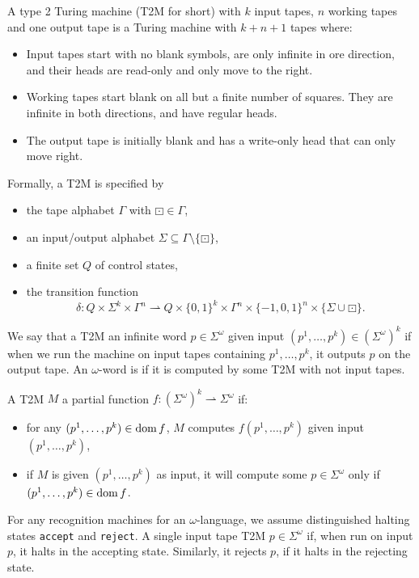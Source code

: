 
A type 2 Turing machine (T2M for short) with $k$ input tapes, $n$ working tapes
and one output tape is a Turing machine with $k+n+1$ tapes where:
\begin{itemize}
\item Input tapes start with no blank symbols, are only infinite in ore
  direction, and their heads are read-only and only move to the right.
\item Working tapes start blank on all but a finite number of squares.
  They are infinite in both directions, and have regular heads.
\item The output tape is initially blank and has a write-only head that can only
  move right.
\end{itemize}

Formally, a T2M is specified by
\begin{itemize}
\item the tape alphabet $\Gamma$ with $\boxdot \in \Gamma$,
\item an input/output alphabet $\Sigma \subseteq \Gamma \setminus \{\boxdot\}$,
\item a finite set $Q$ of control states,
\item the transition function
  \[
	\delta: Q \times \Sigma^k \times \Gamma^n \rightharpoonup Q \times \{0,1\}^k
	\times \Gamma^n \times \{-1,0,1\}^n \times \{\Sigma \cup \boxdot\}.
  \]
\end{itemize}

We say that a T2M  an infinite word $p \in \Sigma^\omega$ given
input $(p^1, \ldots, p^k) \in (\Sigma^\omega)^k$ if when we run the machine on
input tapes containing $p^1, \ldots, p^k$, it outputs $p$ on the output tape.
An $\omega$-word is  if it is computed by some T2M with not
input tapes.

A T2M $M$  a partial function $f: (\Sigma^\omega)^k
\rightharpoonup \Sigma^\omega$ if:
\begin{itemize}
\item for any $(p^1, \ldots, p^k) \in \operatorname{dom} f$, $M$ computes
  $f(p^1, \ldots, p^k)$ given input $(p^1, \ldots, p^k)$,
\item if $M$ is given $(p^1, \ldots, p^k)$ as input, it will compute some $p \in
  \Sigma^\omega$ only if $(p^1, \ldots, p^k) \in \operatorname{dom} f$.
\end{itemize}

For any recognition machines for an $\omega$-language, we assume distinguished
halting states \texttt{accept} and \texttt{reject}.
A single input tape T2M  $p \in \Sigma^\omega$ if, when run on
input $p$, it halts in the accepting state.
Similarly, it rejects $p$, if it halts in the rejecting state.

